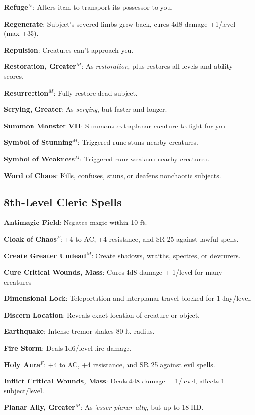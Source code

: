\textbf{Refuge}\(^{M}\): Alters item to transport its possessor to you.

\textbf{Regenerate}: Subject's severed limbs grow back, cures 4d8 damage +1/level (max +35).

\textbf{Repulsion}: Creatures can't approach you.

\textbf{Restoration, Greater}\(^{M}\): As \textit{restoration, }plus restores all levels and ability scores.

\textbf{Resurrection}\(^{M}\): Fully restore dead subject.

\textbf{Scrying, Greater}: As \textit{scrying}, but faster and longer.

\textbf{Summon Monster VII}: Summons extraplanar creature to fight for you.

\textbf{Symbol of Stunning}\(^{M}\): Triggered rune stuns nearby creatures.

\textbf{Symbol of Weakness}\(^{M}\): Triggered rune weakens nearby creatures.

\textbf{Word of Chaos}: Kills, confuses\textit{, }stuns, or deafens nonchaotic subjects.

\subsection{8th-Level Cleric Spells}


\textbf{Antimagic Field}: Negates magic within 10 ft.

\textbf{Cloak of Chaos}\(^{F}\): +4 to AC, +4 resistance, and SR 25 against lawful spells.

\textbf{Create Greater Undead}\(^{M}\): Create shadows, wraiths, spectres, or devourers.

\textbf{Cure Critical Wounds, Mass}: Cures 4d8 damage + 1/level for many creatures.

\textbf{Dimensional Lock}: Teleportation and interplanar travel blocked for 1 day/level.

\textbf{Discern Location}: Reveals exact location of creature or object.

\textbf{Earthquake}: Intense tremor shakes 80-ft. radius.

\textbf{Fire Storm}: Deals 1d6/level fire damage.

\textbf{Holy Aura}\(^{F}\): +4 to AC, +4 resistance, and SR 25 against evil spells.

\textbf{Inflict Critical Wounds, Mass}: Deals 4d8 damage + 1/level, affects 1 subject/level.

\textbf{Planar Ally, Greater}\(^{M}\): As \textit{lesser planar ally, }but up to 18 HD.

